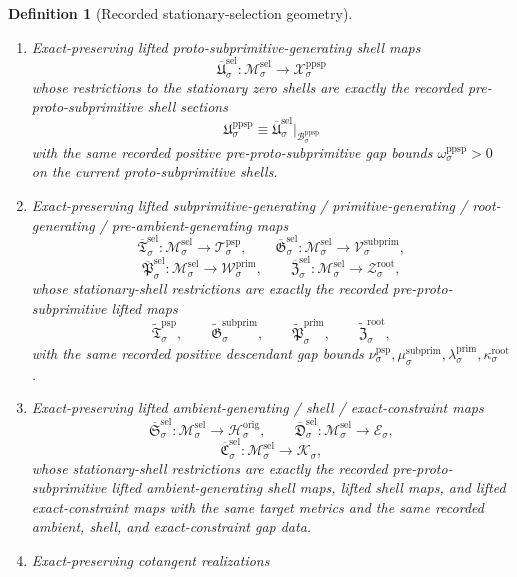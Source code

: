 \documentclass[11pt]{article}
\newcommand{\ShellTarget}[1]{\mathcal E_{#1}}
\newcommand{\ConstraintTarget}[1]{\mathcal K_{#1}}
\newcommand{\OriginTarget}[1]{\mathcal H_{#1}^{\mathrm{orig}}}
\newcommand{\RootTarget}[1]{\mathcal Z_{#1}^{\mathrm{root}}}
\newcommand{\RootGap}[1]{\kappa_{#1}^{\mathrm{root}}}
\newcommand{\PrimTarget}[1]{\mathcal W_{#1}^{\mathrm{prim}}}
\newcommand{\PrimGap}[1]{\lambda_{#1}^{\mathrm{prim}}}
\newcommand{\SubprimTarget}[1]{\mathcal V_{#1}^{\mathrm{subprim}}}
\newcommand{\SubprimGap}[1]{\mu_{#1}^{\mathrm{subprim}}}
\newcommand{\ProtoSubprimTarget}[1]{\mathcal T_{#1}^{\mathrm{psp}}}
\newcommand{\ProtoSubprimGap}[1]{\nu_{#1}^{\mathrm{psp}}}
\newcommand{\PreProtoSubprimTarget}[1]{\mathcal X_{#1}^{\mathrm{ppsp}}}
\newcommand{\PreProtoSubprimGap}[1]{\omega_{#1}^{\mathrm{ppsp}}}
\newcommand{\PreProtoSubprimSpace}[1]{\mathcal B_{#1}^{\mathrm{ppsp}}}
\newcommand{\PreProtoSubprimSection}[1]{\mathfrak U_{#1}^{\mathrm{ppsp}}}
\newcommand{\PreProtoSubprimLiftedSubprimitive}[1]{\widetilde{\mathfrak T}_{#1}^{\mathrm{psp}}}
\newcommand{\PreProtoSubprimLiftedPrimitive}[1]{\widetilde{\mathfrak G}_{#1}^{\mathrm{subprim}}}
\newcommand{\PreProtoSubprimLiftedRoot}[1]{\widetilde{\mathfrak P}_{#1}^{\mathrm{prim}}}
\newcommand{\PreProtoSubprimLiftedPreAmbient}[1]{\widetilde{\mathfrak Z}_{#1}^{\mathrm{root}}}
\newcommand{\SelSpace}[1]{\mathcal M_{#1}^{\mathrm{sel}}}
\newcommand{\SelMetric}[1]{S_{#1}^{\mathrm{sel}}}
\newcommand{\SelGap}[1]{\zeta_{#1}^{\mathrm{sel}}}
\newcommand{\SelLiftedPreProto}[1]{\overline{\mathfrak U}_{#1}^{\mathrm{sel}}}
\newcommand{\SelLiftedSubprimitive}[1]{\overline{\mathfrak T}_{#1}^{\mathrm{sel}}}
\newcommand{\SelLiftedPrimitive}[1]{\overline{\mathfrak G}_{#1}^{\mathrm{sel}}}
\newcommand{\SelLiftedRoot}[1]{\overline{\mathfrak P}_{#1}^{\mathrm{sel}}}
\newcommand{\SelLiftedPreAmbient}[1]{\overline{\mathfrak Z}_{#1}^{\mathrm{sel}}}
\newcommand{\SelLiftedAmbient}[1]{\overline{\mathfrak S}_{#1}^{\mathrm{sel}}}
\newcommand{\SelLiftedShell}[1]{\overline{\mathfrak D}_{#1}^{\mathrm{sel}}}
\newcommand{\SelConstraintMap}[1]{\overline{\mathfrak C}_{#1}^{\mathrm{sel}}}
\newtheorem{definition}{Definition}
\begin{document}
\begin{definition}[Recorded stationary-selection geometry]
\begin{enumerate}
\begin{equation}
    \right)
    \ge
    \SelGap{\sigma}\,
    \SelMetric{\sigma}(\xi,\xi),
    \qquad
    \SelGap{\sigma}>0,
    \label{eq:recorded_selection_gap}
    \end{equation}
    for all \(x\in\PreProtoSubprimSpace{\sigma}\) and all \(\xi\) orthogonal, with respect to \(\SelMetric{\sigma}\), to \(T_x\PreProtoSubprimSpace{\sigma}\).
    \item Exact-preserving lifted proto-subprimitive-generating shell maps
    \[
    \SelLiftedPreProto{\sigma}:\SelSpace{\sigma}\to\PreProtoSubprimTarget{\sigma}
    \]
    whose restrictions to the stationary zero shells are exactly the recorded pre-proto-subprimitive shell sections
    \[
    \PreProtoSubprimSection{\sigma}\equiv \SelLiftedPreProto{\sigma}|_{\PreProtoSubprimSpace{\sigma}}
    \]
    with the same recorded positive pre-proto-subprimitive gap bounds \(\PreProtoSubprimGap{\sigma}>0\) on the current proto-subprimitive shells.
    \item Exact-preserving lifted subprimitive-generating / primitive-generating / root-generating / pre-ambient-generating maps
    \[
    \SelLiftedSubprimitive{\sigma}:\SelSpace{\sigma}\to\ProtoSubprimTarget{\sigma},\qquad
    \SelLiftedPrimitive{\sigma}:\SelSpace{\sigma}\to\SubprimTarget{\sigma},
    \]
    \[
    \SelLiftedRoot{\sigma}:\SelSpace{\sigma}\to\PrimTarget{\sigma},\qquad
    \SelLiftedPreAmbient{\sigma}:\SelSpace{\sigma}\to\RootTarget{\sigma},
    \]
    whose stationary-shell restrictions are exactly the recorded pre-proto-subprimitive lifted maps
    \[
    \PreProtoSubprimLiftedSubprimitive{\sigma},\qquad
    \PreProtoSubprimLiftedPrimitive{\sigma},\qquad
    \PreProtoSubprimLiftedRoot{\sigma},\qquad
    \PreProtoSubprimLiftedPreAmbient{\sigma},
    \]
    with the same recorded positive descendant gap bounds \(\ProtoSubprimGap{\sigma},\SubprimGap{\sigma},\PrimGap{\sigma},\RootGap{\sigma}\).
    \item Exact-preserving lifted ambient-generating / shell / exact-constraint maps
    \[
    \SelLiftedAmbient{\sigma}:\SelSpace{\sigma}\to\OriginTarget{\sigma},\qquad
    \SelLiftedShell{\sigma}:\SelSpace{\sigma}\to\ShellTarget{\sigma},
    \]
    \[
    \SelConstraintMap{\sigma}:\SelSpace{\sigma}\to\ConstraintTarget{\sigma},
    \]
    whose stationary-shell restrictions are exactly the recorded pre-proto-subprimitive lifted ambient-generating shell maps, lifted shell maps, and lifted exact-constraint maps with the same target metrics and the same recorded ambient, shell, and exact-constraint gap data.
    \item Exact-preserving cotangent realizations

\end{enumerate}
\end{definition}
\end{document}
